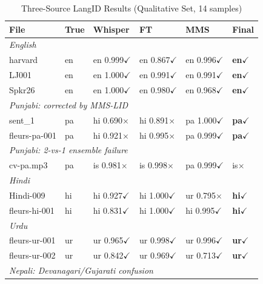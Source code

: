 \documentclass[conference]{IEEEtran}
\begin{document}
\begin{table}[htbp]
\caption{Three-Source LangID Results (Qualitative Set, 14 samples)}
\label{tab:langid}
\begin{center}
\small
\begin{tabular}{p{2.0cm}lp{2.0cm}p{1.6cm}p{1.6cm}l}
\toprule
\textbf{File} & \textbf{True} & \textbf{Whisper} & \textbf{FT} & \textbf{MMS} & \textbf{Final} \\
\midrule
\multicolumn{6}{l}{\footnotesize\textit{English}} \\
harvard        & en & en 0.999$\checkmark$ & en 0.867$\checkmark$ & en 0.996$\checkmark$ & \textbf{en}$\checkmark$ \\
LJ001          & en & en 1.000$\checkmark$ & en 0.991$\checkmark$ & en 0.991$\checkmark$ & \textbf{en}$\checkmark$ \\
Spkr26         & en & en 1.000$\checkmark$ & en 0.980$\checkmark$ & en 0.968$\checkmark$ & \textbf{en}$\checkmark$ \\
\midrule
\multicolumn{6}{l}{\footnotesize\textit{Punjabi: corrected by MMS-LID}} \\
sent\_1        & pa & hi 0.690$\times$ & hi 0.891$\times$ & pa 1.000$\checkmark$ & \textbf{pa}$\checkmark$ \\
fleurs-pa-001  & pa & hi 0.921$\times$ & hi 0.995$\times$ & pa 0.999$\checkmark$ & \textbf{pa}$\checkmark$ \\
\multicolumn{6}{l}{\footnotesize\textit{Punjabi: 2-vs-1 ensemble failure}} \\
cv-pa.mp3      & pa & is 0.981$\times$ & is 0.998$\times$ & pa 0.999$\checkmark$ & is$\times$ \\
\midrule
\multicolumn{6}{l}{\footnotesize\textit{Hindi}} \\
Hindi-009      & hi & hi 0.927$\checkmark$ & hi 1.000$\checkmark$ & ur 0.795$\times$ & \textbf{hi}$\checkmark$ \\
fleurs-hi-001  & hi & hi 0.831$\checkmark$ & hi 1.000$\checkmark$ & hi 0.995$\checkmark$ & \textbf{hi}$\checkmark$ \\
\midrule
\multicolumn{6}{l}{\footnotesize\textit{Urdu}} \\
fleurs-ur-001  & ur & ur 0.965$\checkmark$ & ur 0.998$\checkmark$ & ur 0.996$\checkmark$ & \textbf{ur}$\checkmark$ \\
fleurs-ur-002  & ur & ur 0.842$\checkmark$ & ur 0.969$\checkmark$ & ur 0.713$\checkmark$ & \textbf{ur}$\checkmark$ \\
\midrule
\multicolumn{6}{l}{\footnotesize\textit{Nepali: Devanagari/Gujarati confusion}} \\

\end{tabular}
\end{center}
\end{table}
\end{document}
